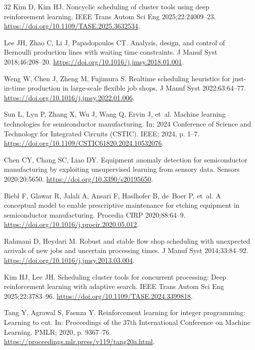 \documentclass[final,5p,times,twocolumn]{elsarticle}
\begin{document}
\begin{thebibliography}{32}
Kim D, Kim HJ. Noncyclic scheduling of cluster tools using deep reinforcement learning.
IEEE Trans Autom Sci Eng 2025;22:24009--23.
\url{https://doi.org/10.1109/TASE.2025.3632534}.

Lee JH, Zhao C, Li J, Papadopoulos CT. Analysis, design, and control of {Bernoulli} production lines with waiting time constraints.
J Manuf Syst 2018;46:208--20.
\url{https://doi.org/10.1016/j.jmsy.2018.01.001}.

Weng W, Chen J, Zheng M, Fujimura S. Realtime scheduling heuristics for just-in-time production in large-scale flexible job shops.
J Manuf Syst 2022;63:64--77.
\url{https://doi.org/10.1016/j.jmsy.2022.01.006}.

Sun L, Lyu P, Zhang X, Wu J, Wang Q, Ervin J, et~al. Machine learning technologies for semiconductor manufacturing.
In: 2024 Conference of Science and Technology for Integrated Circuits (CSTIC). IEEE; 2024, p. 1--7.
\url{https://doi.org/10.1109/CSTIC61820.2024.10532076}.

Chen CY, Chang SC, Liao DY. Equipment anomaly detection for semiconductor manufacturing by exploiting unsupervised learning from sensory data.
Sensors 2020;20:5650.
\url{https://doi.org/10.3390/s20195650}.

Biebl F, Glawar R, Jalali A, Ansari F, Haslhofer B, de~Boer P, et~al. A conceptual model to enable prescriptive maintenance for etching equipment in semiconductor manufacturing.
Procedia CIRP 2020;88:64--9.
\url{https://doi.org/10.1016/j.procir.2020.05.012}.

Rahmani D, Heydari M. Robust and stable flow shop scheduling with unexpected arrivals of new jobs and uncertain processing times.
J Manuf Syst 2014;33:84--92.
\url{https://doi.org/10.1016/j.jmsy.2013.03.004}.

Kim HJ, Lee JH. Scheduling cluster tools for concurrent processing: Deep reinforcement learning with adaptive search.
IEEE Trans Autom Sci Eng 2025;22:3783--96.
\url{https://doi.org/10.1109/TASE.2024.3399818}.

Tang Y, Agrawal S, Faenza Y. Reinforcement learning for integer programming: Learning to cut.
In: Proceedings of the 37th International Conference on Machine Learning. PMLR; 2020, p. 9367--76.
\url{https://proceedings.mlr.press/v119/tang20a.html}.


\end{thebibliography}
\end{document}
